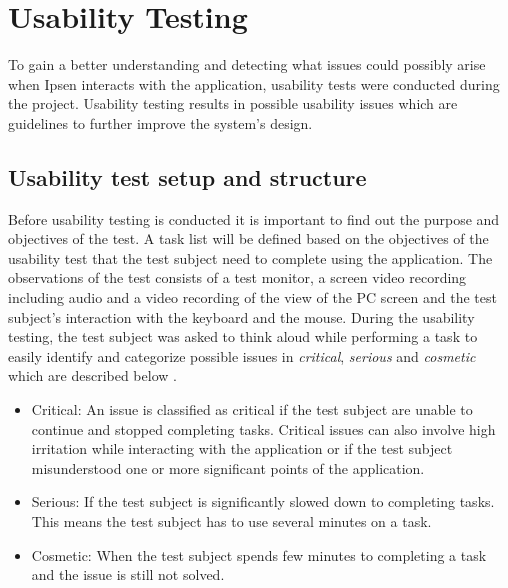 \section{Usability Testing} \label{sec:usabilitytesting}

To gain a better understanding and detecting what issues could possibly arise when Ipsen interacts with the application, usability tests were conducted during the project.
Usability testing results in possible usability issues which are guidelines to further improve the system's design.

\subsection{Usability test setup and structure}
Before usability testing is conducted it is important to find out the purpose and objectives of the test.
A task list will be defined based on the objectives of the usability test that the test subject need to complete using the application.
The observations of the test consists of a test monitor, a screen video recording including audio and a video recording of the view of the PC screen and the test subject's interaction with the keyboard and the mouse.
During the usability testing, the test subject was asked to think aloud while performing a task to easily identify and categorize possible issues in \textit{critical}, \textit{serious} and \textit{cosmetic} which are described below \citep[p.~154]{brugervenligtwebdesign}.

\begin{itemize}
  \item Critical: An issue is classified as critical if the test subject are unable to continue and stopped completing tasks.
Critical issues can also involve high irritation while interacting with the application or if the test subject misunderstood one or more significant points of the application.
  \item Serious: If the test subject is significantly slowed down to completing tasks.
This means the test subject has to use several minutes on a task.
	\item Cosmetic: When the test subject spends few minutes to completing a task and the issue is still not solved. %
\end{itemize}

